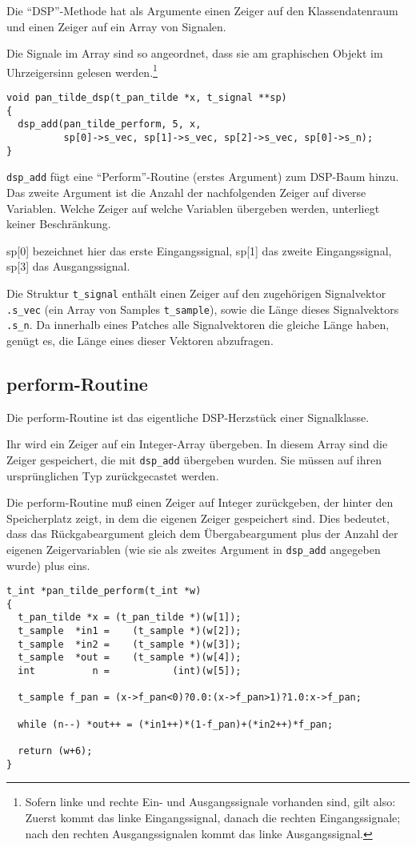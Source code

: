 \documentclass[12pt, a4paper,austrian, titlepage]{article}
\begin{document}
Die ``DSP''-Methode hat als Argumente einen Zeiger auf den Klassendatenraum und
einen Zeiger auf ein Array von Signalen.

Die Signale im Array sind so angeordnet, dass sie am graphischen Objekt
im Uhrzeigersinn gelesen werden.\footnote{
Sofern linke und rechte Ein- und Ausgangssignale vorhanden sind, gilt also:
Zuerst kommt das linke Eingangssignal, danach die rechten Eingangssignale;
nach den rechten Ausgangssignalen kommt das linke Ausgangssignal.
}

\begin{verbatim}
void pan_tilde_dsp(t_pan_tilde *x, t_signal **sp)
{
  dsp_add(pan_tilde_perform, 5, x,
          sp[0]->s_vec, sp[1]->s_vec, sp[2]->s_vec, sp[0]->s_n);
}
\end{verbatim}

\verb+dsp_add+ fügt eine ``Perform''-Routine (erstes Argument) zum DSP-Baum hinzu.
Das zweite Argument ist die Anzahl der nachfolgenden Zeiger auf diverse Variablen.
Welche Zeiger auf welche Variablen übergeben werden, unterliegt keiner Beschränkung.

sp[0] bezeichnet hier das erste Eingangssignal, sp[1] das zweite Eingangssignal,
sp[3] das Ausgangssignal.

Die Struktur \verb+t_signal+ enthält einen Zeiger auf den
zugehörigen Signalvektor \verb+.s_vec+ (ein Array von Samples \verb+t_sample+),
sowie die Länge dieses Signalvektors \verb+.s_n+.
Da innerhalb eines Patches alle Signalvektoren die gleiche Länge haben,
genügt es, die Länge eines dieser Vektoren abzufragen.

\subsection{perform-Routine}
Die perform-Routine ist das eigentliche DSP-Herzstück einer Signalklasse.

Ihr wird ein Zeiger auf ein Integer-Array übergeben.
In diesem Array sind die Zeiger gespeichert, die mit \verb+dsp_add+ übergeben wurden.
Sie müssen auf ihren ursprünglichen Typ zurückgecastet werden.

Die perform-Routine muß einen Zeiger auf Integer zurückgeben, der hinter den
Speicherplatz zeigt, in dem die eigenen Zeiger gespeichert sind.
Dies bedeutet, dass das Rückgabeargument gleich dem Übergabeargument plus der
Anzahl der eigenen Zeigervariablen (wie sie als zweites Argument in
\verb+dsp_add+ angegeben wurde) plus eins.

\begin{verbatim}
t_int *pan_tilde_perform(t_int *w)
{
  t_pan_tilde *x = (t_pan_tilde *)(w[1]);
  t_sample  *in1 =    (t_sample *)(w[2]);
  t_sample  *in2 =    (t_sample *)(w[3]);
  t_sample  *out =    (t_sample *)(w[4]);
  int          n =           (int)(w[5]);

  t_sample f_pan = (x->f_pan<0)?0.0:(x->f_pan>1)?1.0:x->f_pan;

  while (n--) *out++ = (*in1++)*(1-f_pan)+(*in2++)*f_pan;

  return (w+6);
}
\end{verbatim}
\end{document}
